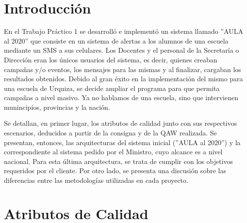 \documentclass[a4paper, 11pt]{article}
\begin{document}
\pagestyle{myheadings}
\maketitle

\thispagestyle{empty}
\tableofcontents

\newpage

\section{Introducci\'on}
En el Trabajo Práctico 1 se desarrolló e implementó un sistema llamado ''AULA al 2020'' que consiste en un sistema de alertas a los alumnos de una escuela mediante un SMS a sus celulares. Los Docentes y el personal de la Secretaría o Dirección eran los únicos usuarios del sistema, es decir, quienes creaban campañas y/o eventos, los mensajes para las mismas y al finalizar, cargaban los resultados obtenidos. Debido al gran éxito en la implementación del mismo para una escuela de Urquiza, se decide ampliar el programa para que permita campañas a nivel masivo. Ya no hablamos de una escuela, sino que intervienen munincipios, provincias y la nación. 

Se detallan, en primer lugar, los atributos de calidad junto con sus respectivos escenarios, deducidos a partir de la consigna y de la QAW realizada. 
Se presentan, entonces, las arquitecturas del sistema inicial (''AULA al 2020'') y la correspondiente al sistema pedido por el Ministro, cuyo alcance es a nivel nacional. Para esta última arquitectura, se trata de cumplir con los objetivos requeridos por el cliente. Por otro lado, se presenta una discusión sobre las diferencias entre las metodologías utilizadas en cada proyecto.


\newpage
\section{Atributos de Calidad}
\end{document}

